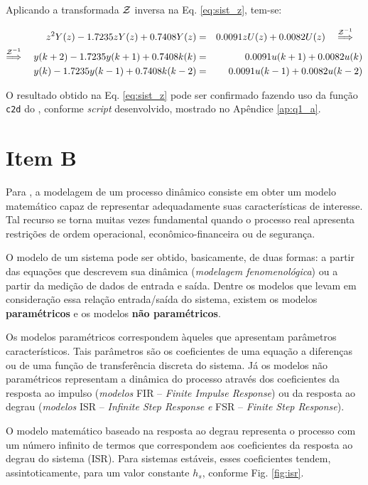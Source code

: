 Aplicando a transformada $\mathcal{Z}$ inversa na Eq. \ref{eq:sist_z}, tem-se:

\begin{eqnarray}
z^2Y(z) - 1.7235zY(z) + 0.7408Y(z) & = & 0.0091zU(z) + 0.0082U(z)
\quad\stackrel{\mathcal{Z}^{-1}}{\Longrightarrow}\quad\nonumber\\
\stackrel{\mathcal{Z}^{-1}}{\Longrightarrow}\quad
y(k+2) - 1.7235y(k+1) + 0.7408k(k) & = & 
0.0091u(k+1) + 0.0082u(k)\nonumber\\
y(k) - 1.7235y(k-1) + 0.7408k(k-2) & = & 
0.0091u(k-1) + 0.0082u(k-2)\label{eq:yk}
\end{eqnarray}

O resultado obtido na Eq. \ref{eq:sist_z} pode ser confirmado fazendo uso da
função {\tt c2d} do \Matlab, conforme {\it
script} desenvolvido, mostrado no Apêndice \ref{ap:q1_a}.

\section*{Item B}
Para , a modelagem de um processo dinâmico consiste em
obter um modelo matemático capaz de representar adequadamente suas
características de interesse. Tal recurso se torna muitas vezes fundamental
quando o processo real apresenta restrições de ordem operacional,
econômico-financeira ou de segurança.

O modelo de um sistema pode ser obtido, basicamente, de duas formas: a partir
das equações que descrevem sua dinâmica ({\it modelagem fenomenológica}) ou a
partir da medição de dados de entrada e saída. Dentre os modelos que levam em
consideração essa relação entrada/saída do sistema, existem os modelos {\bf
paramétricos} e os modelos {\bf não paramétricos}.

Os modelos paramétricos correspondem àqueles que apresentam parâmetros
característicos. Tais parâmetros são os coeficientes de uma equação a diferenças
ou de uma função de transferência discreta do sistema. Já os modelos não
paramétricos representam a dinâmica do processo através dos coeficientes da
resposta ao impulso ({\it modelos} FIR -- {\it Finite Impulse Response}) ou da
resposta ao degrau ({\it modelos} ISR -- {\it Infinite Step Response} {\it e}
FSR -- {\it Finite Step Response}). \cite{santos:2007}

O modelo matemático baseado na resposta ao degrau representa o processo com um
número infinito de termos que correspondem aos coeficientes da resposta ao
degrau do sistema (ISR). Para sistemas estáveis, esses coeficientes tendem,
assintoticamente, para um valor constante $h_s$, conforme Fig. \ref{fig:isr}.

